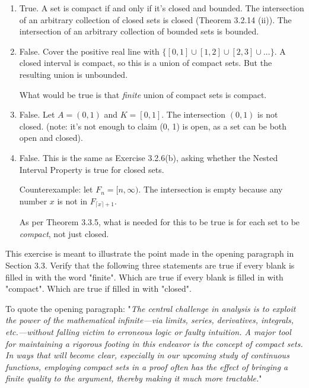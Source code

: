 \documentclass{oxmathproblems}
\begin{document}
\begin{questions}
\begin{solution}
  \begin{enumerate}[label=(\alph*)]
    \item True. A set is compact if and only if it's closed and bounded. The intersection of an arbitrary collection of closed sets is closed (Theorem 3.2.14 (ii)). The intersection
    of an arbitrary collection of bounded sets is bounded.

    \item False. Cover the positive real line with $\{[0, 1] \cup [1, 2] \cup [2, 3] \cup ...\}$. A closed interval is compact, so this is a union of compact sets. But the resulting
    union is unbounded.

    What would be true is that \textit{finite} union of compact sets is compact.

    \item False. Let $A = (0, 1)$ and $K = [0, 1]$. The intersection $(0, 1)$ is not closed. (note: it's not enough to claim (0, 1) is open, as a set can be both open and closed).
    
    \item False. This is the same as Exercise 3.2.6(b), asking whether the Nested Interval Property is true for closed sets. 
    
    Counterexample: let $F_{n} = [n, \infty)$. The intersection is empty because
    any number $x$ is not in $F_{\lceil x \rceil + 1}$.

    As per Theorem 3.3.5, what is needed for this to be true is for each set to be \textit{compact}, not just closed.
  \end{enumerate}
\end{solution}

\miquestion This exercise is meant to illustrate the point made in the opening paragraph in Section 3.3. Verify that the following three statements are true if
every blank is filled in with the word "finite". Which are true if every blank is filled in with "compact". Which are true if filled in with "closed".

To quote the opening paragraph: "\textit{The central challenge in analysis is to exploit the power of the mathematical
infinite—via limits, series, derivatives, integrals, etc.—without falling victim to
erroneous logic or faulty intuition. A major tool for maintaining a rigorous
footing in this endeavor is the concept of compact sets. In ways that will become
clear, especially in our upcoming study of continuous functions, employing
compact sets in a proof often has the effect of bringing a finite quality to the
argument, thereby making it much more tractable.}"


\end{questions}
\end{document}
